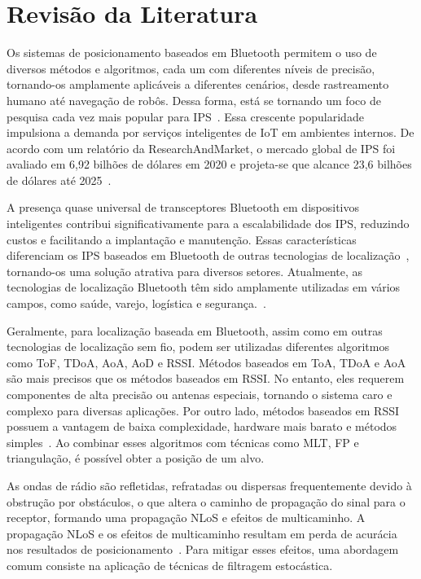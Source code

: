 \chapter{Revisão da Literatura}
\label{chap:desenv}

Os sistemas de posicionamento baseados em Bluetooth permitem o uso de diversos métodos e algoritmos, cada um com diferentes níveis de precisão, tornando-os amplamente aplicáveis a diferentes cenários, desde rastreamento humano até navegação de robôs. Dessa forma, está se tornando um foco de pesquisa cada vez mais popular para IPS~\cite{Zhuang2022}. Essa crescente popularidade impulsiona a demanda por serviços inteligentes de IoT em ambientes internos. De acordo com um relatório da ResearchAndMarket, o mercado global de IPS foi avaliado em 6,92 bilhões de dólares em 2020 e projeta-se que alcance 23,6 bilhões de dólares até 2025~\cite{Farahsari2022}.

A presença quase universal de transceptores Bluetooth em dispositivos inteligentes contribui significativamente para a escalabilidade dos IPS, reduzindo custos e facilitando a implantação e manutenção. Essas características diferenciam os IPS baseados em Bluetooth de outras tecnologias de localização~\cite{Zhuang2022, Yu2021}, tornando-os uma solução atrativa para diversos setores. Atualmente, as tecnologias de localização Bluetooth têm sido amplamente utilizadas em vários campos, como saúde, varejo, logística e segurança.~\cite{Philips2023}. 

Geralmente, para localização baseada em Bluetooth, assim como em outras tecnologias de localização sem fio, podem ser utilizadas diferentes algoritmos como ToF, TDoA, AoA, AoD e RSSI. Métodos baseados em ToA, TDoA e AoA são mais precisos que os métodos baseados em RSSI. No entanto, eles requerem componentes de alta precisão ou antenas especiais, tornando o sistema caro e complexo para diversas aplicações. Por outro lado, métodos baseados em RSSI possuem a vantagem de baixa complexidade, hardware mais barato e métodos simples~\cite{Assayag2023}. Ao combinar esses algoritmos com técnicas como MLT, FP e triangulação, é possível obter a posição de um alvo.

As ondas de rádio são refletidas, refratadas ou dispersas frequentemente devido à obstrução por obstáculos, o que altera o caminho de propagação do sinal para o receptor, formando uma propagação NLoS e efeitos de multicaminho. A propagação NLoS e os efeitos de multicaminho resultam em perda de acurácia nos resultados de posicionamento~\cite{Yao2020}. Para mitigar esses efeitos, uma abordagem comum consiste na aplicação de técnicas de filtragem estocástica.

